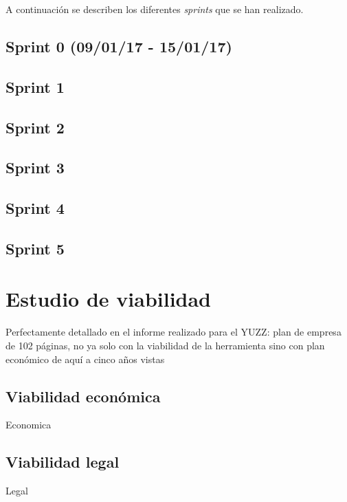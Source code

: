 A continuación se describen los diferentes \emph{sprints} que se han
realizado.


\subsection{Sprint 0 (09/01/17 -
15/01/17)}\label{sprint-0}

\subsection{Sprint 1}

\subsection{Sprint 2}

\subsection{Sprint 3}

\subsection{Sprint 4}

\subsection{Sprint 5}


\section{Estudio de viabilidad}\label{estudio-viabilidad}
Perfectamente detallado en el informe realizado para el YUZZ: plan de empresa de 102 páginas, no ya solo con la viabilidad de la herramienta sino con plan económico de aquí a cinco años vistas 


\subsection{Viabilidad económica}\label{viabilidad-economica}
Economica

\subsection{Viabilidad legal}\label{viabilidad-legal}
Legal



